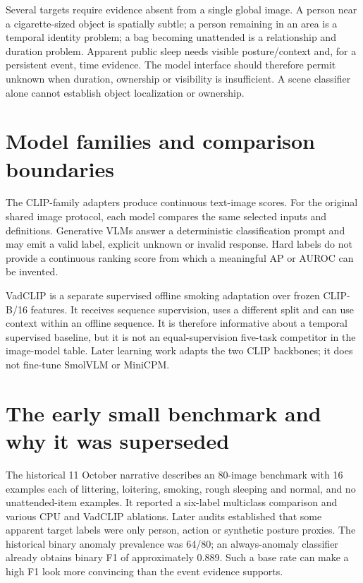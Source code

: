 Several targets require evidence absent from a single global image. A person near a cigarette-sized object is spatially subtle; a person remaining in an area is a temporal identity problem; a bag becoming unattended is a relationship and duration problem. Apparent public sleep needs visible posture/context and, for a persistent event, time evidence. The model interface should therefore permit unknown when duration, ownership or visibility is insufficient. A scene classifier alone cannot establish object localization or ownership.

\section{Model families and comparison boundaries}

The CLIP-family adapters produce continuous text-image scores. For the original shared image protocol, each model compares the same selected inputs and definitions. Generative VLMs answer a deterministic classification prompt and may emit a valid label, explicit unknown or invalid response. Hard labels do not provide a continuous ranking score from which a meaningful AP or AUROC can be invented.

VadCLIP is a separate supervised offline smoking adaptation over frozen CLIP-B/16 features. It receives sequence supervision, uses a different split and can use context within an offline sequence. It is therefore informative about a temporal supervised baseline, but it is not an equal-supervision five-task competitor in the image-model table. Later learning work adapts the two CLIP backbones; it does not fine-tune SmolVLM or MiniCPM.

\section{The early small benchmark and why it was superseded}
The historical 11 October narrative describes an 80-image benchmark with 16 examples each of littering, loitering, smoking, rough sleeping and normal, and no unattended-item examples. It reported a six-label multiclass comparison and various CPU and VadCLIP ablations. Later audits established that some apparent target labels were only person, action or synthetic posture proxies. The historical binary anomaly prevalence was 64/80; an always-anomaly classifier already obtains binary F1 of approximately 0.889. Such a base rate can make a high F1 look more convincing than the event evidence supports.

